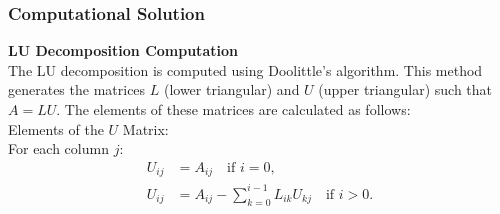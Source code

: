 \documentclass{beamer}
\begin{document}
\begin{frame}
\frametitle{Computational Solution}
\textbf{LU Decomposition Computation}\\
The LU decomposition is computed using Doolittle's algorithm. This method generates the matrices \( L \) (lower triangular) and \( U \) (upper triangular) such that \( A = LU \). The elements of these matrices are calculated as follows: \\
Elements of the \( U \) Matrix:  \\
For each column \( j \):
\begin{align}
    U_{ij} &= A_{ij} \quad \text{if } i = 0, \\
    U_{ij} &= A_{ij} - \sum_{k=0}^{i-1} L_{ik} U_{kj} \quad \text{if } i > 0.
\end{align}
    
\end{frame}
\end{document}
